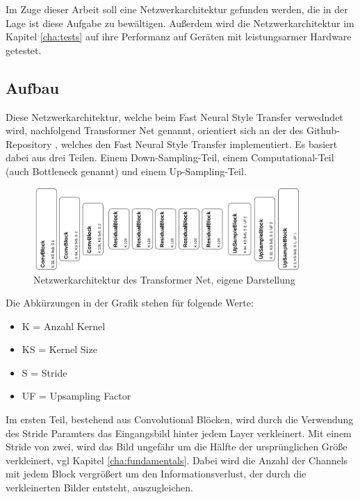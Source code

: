 Im Zuge dieser Arbeit soll eine Netzwerkarchitektur gefunden werden, die in der Lage ist diese Aufgabe zu bewältigen. Außerdem wird die Netzwerkarchitektur im Kapitel \ref{cha:tests} auf ihre Performanz auf Geräten mit leistungsarmer Hardware getestet.

\subsection{Aufbau}
\label{sec:aufbau}

Diese Netzwerkarchitektur, welche beim Fast Neural Style Transfer verwedndet wird, nachfolgend Transformer Net genannt, orientiert sich an der des Github-Repository \cite{PyTorchFastNeuralStyle}, welches den Fast Neural Style Transfer implementiert.
Es basiert dabei aus drei Teilen. Einem Down-Sampling-Teil, einem Computational-Teil (auch Bottleneck genannt) und einem Up-Sampling-Teil.

\begin{figure}[H]
	\centering
	\includegraphics[width=0.90\textwidth]{resources/content/transformer_net.png}
	\caption{Netzwerkarchitektur des Transformer Net, eigene Darstellung}
	\label{img:transformer_net_img}
\end{figure}

\pagebreak

Die Abkürzungen in der Grafik stehen für folgende Werte:

\begin{itemize}
	\item K = Anzahl Kernel
	\item KS = Kernel Size
	\item S = Stride
	\item UF = Upsampling Factor
\end{itemize}

Im ersten Teil, bestehend aus Convolutional Blöcken, wird durch die Verwendung des Stride Paramters das Eingangsbild hinter jedem Layer verkleinert.
Mit einem Stride von zwei, wird das Bild ungefähr um die Hälfte der ursprünglichen Größe verkleinert, vgl Kapitel \ref{cha:fundamentals}. Dabei wird die Anzahl der Channels mit jedem Block vergrößert um den Informationsverlust, der durch die verkleinerten Bilder entsteht, auszugleichen.

